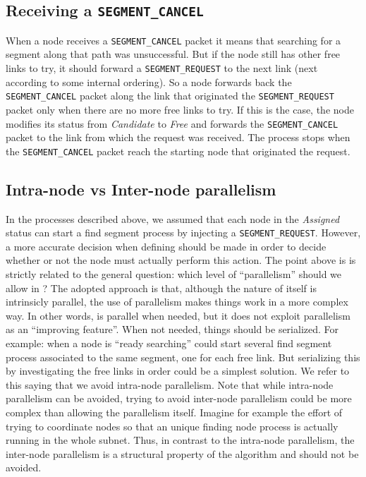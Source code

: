 \subsection{Receiving a \texttt{SEGMENT\_CANCEL}}
When a node receives a \texttt{SEGMENT\_CANCEL} packet it means that searching
for a segment along that path was unsuccessful. But if the node still
has other free links to try, it should forward a \texttt{SEGMENT\_REQUEST} to
the next link (next according to some internal ordering). So a node
forwards back the \texttt{SEGMENT\_CANCEL} packet along the link that originated
the \texttt{SEGMENT\_REQUEST} packet only when there are no more free links to
try. If this is the case, the node modifies its status from
\emph{Candidate} to \emph{Free} and forwards the \texttt{SEGMENT\_CANCEL} packet to the link from which
the request was received. The process stops when the \texttt{SEGMENT\_CANCEL}
packet reach the starting node that originated the request.

\subsection{Intra-node vs Inter-node parallelism}
In the processes described above, we assumed that each node in the
\emph{Assigned} status can start a find segment process by injecting a
\texttt{SEGMENT\_REQUEST}. However, a more accurate decision when
defining \disr{} should be made in order to decide whether or not the
node must actually perform this action.  The point above is is
strictly related to the general question: which level of “parallelism”
should we allow in \disr{} ? The adopted approach is that, although
the nature of \disr{} itself is intrinsicly parallel, the use of
parallelism makes things work in a more complex way. In other words,
\disr{} is parallel when needed, but it does not exploit parallelism
as an “improving feature”. When not needed, things should be
serialized. For example: when a node is “ready searching” could start
several find segment process associated to the same segment, one for
each free link. But serializing this by investigating the free links
in order could be a simplest solution. We refer to this saying that we
avoid intra-node parallelism.  Note that while intra-node parallelism
can be avoided, trying to avoid inter-node parallelism could be more
complex than allowing the parallelism itself. Imagine for example the
effort of trying to coordinate nodes so that an unique finding node
process is actually running in the whole subnet. Thus, in contrast to
the intra-node parallelism, the inter-node parallelism is a structural
property of the \disr{} algorithm and should not be avoided.
